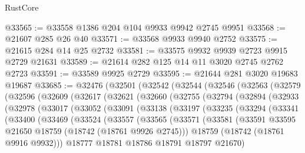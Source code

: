 \begin{lexlean}{RustCore}
\begin{coremodule}
@33565 := @33558 @1386 @204 @104 @9933 @9942 @2745 @9951
@33568 := @21607 @285 @26 @40
@33571 := @33568 @9933 @9940 @2752
@33575 := @21615 @284 @14 @25 @2732
@33581 := @33575 @9932 @9939 @2723 @9915 @2729 @21631
@33589 := @21614 @282 @125 @14 @11 @3020 @2745 @2762 @2723
@33591 := @33589 @9925 @2729
@33595 := @21644 @281 @3020 @19683 @19687
@33685 := @32476
    (@32501
      (@32542
        (@32544
          (@32546
            (@32563
              (@32579
                (@32596
                  (@32609
                    (@32617
                      (@32621
                        (@32660
                          (@32755
                            (@32794
                              (@32894
                                (@32933
                                  (@32978
                                    (@33017
                                      (@33052
                                        (@33091
                                          (@33138
                                            (@33197
                                              (@33235
                                                (@33294
                                                  (@33341
                                                    (@33400
                                                      (@33469
                                                        (@33524
                                                          (@33557
                                                            (@33565
                                                              (@33571
                                                                (@33581
                                                                  (@33591
                                                                    @33595
                                                                    @21650
                                                                    @18759
                                                                    (@18742 (@18761 @9926 @2745)))
                                                                  @18759
                                                                  (@18742 (@18761 @9916 @9932)))
                                                                @18777
                                                                @18781
                                                                @18786
                                                                @18791
                                                                @18797
                                                                @21670)

\end{coremodule}
\end{lexlean}
